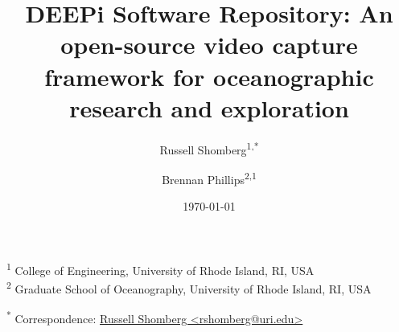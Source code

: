 \documentclass[
  10pt,
  draftcls,
  technote,
  letterpaper,
  oneside,
  onecolumn]{IEEEtran}
\title{DEEPi Software Repository: An open-source video capture framework for oceanographic research and exploration}
\author{Russell Shomberg\textsuperscript{1,*} \and Brennan Phillips\textsuperscript{2,1}}
\date{\today}
\begin{document}
\maketitle
\begin{abstract}

\end{abstract}

\textsuperscript{1} College of Engineering, University of Rhode Island,
RI, USA\\
\textsuperscript{2} Graduate School of Oceanography, University of Rhode
Island, RI, USA

\textsuperscript{*} Correspondence:
\href{mailto:rshomberg@uri.edu}{Russell Shomberg
\textless{}rshomberg@uri.edu\textgreater{}}





\printbibliography


\end{document}
